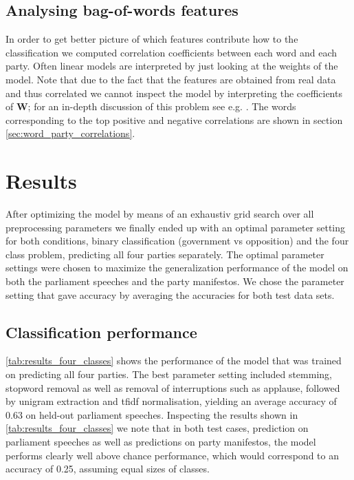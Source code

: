 \documentclass{article} %
\renewcommand{\vec}[1]{\mathbf{#1}}
\begin{document}
\subsection{Analysing bag-of-words features}
In order to get  better picture of which features contribute how to the classification we computed correlation coefficients between each word and each party. Often linear models are interpreted by just looking at the weights of the model. Note that due to the fact that the features are obtained from real data and thus correlated we cannot inspect the model by interpreting the coefficients of $\vec{W}$; for an in-depth discussion of this problem see e.g. \cite{Haufe2013}. The words corresponding to the top positive and negative correlations are shown in section \autoref{sec:word_party_correlations}.

\section{Results}
After optimizing the model by means of an exhaustiv grid search over all preprocessing parameters we finally ended up with an optimal parameter setting for both conditions, binary classification (government vs opposition) and the four class problem, predicting all four parties separately. The optimal parameter settings were chosen to maximize the generalization performance of the model on both the parliament speeches and the party manifestos. We chose the parameter setting that gave accuracy by averaging the accuracies for both test data sets. 

\subsection{Classification performance}
\autoref{tab:results_four_classes} shows the performance of the model that was trained on predicting all four parties. The best parameter setting included stemming, stopword removal as well as removal of interruptions such as applause, followed by unigram extraction and tfidf normalisation, yielding an average accuracy of 0.63 on held-out parliament speeches. Inspecting the results shown in \autoref{tab:results_four_classes} we note that in both test cases, prediction on parliament speeches as well as predictions on party manifestos, the model performs clearly well above chance performance, which would correspond to an accuracy of 0.25, assuming equal sizes of classes. 

\end{document}
